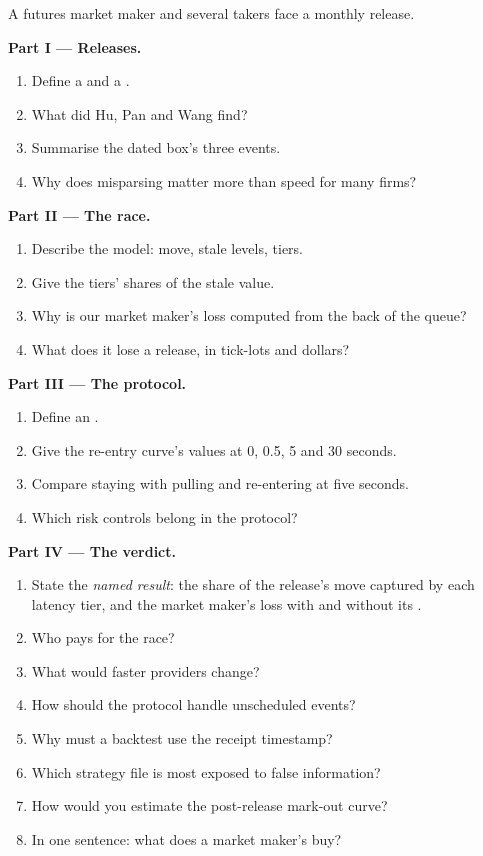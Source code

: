 \begin{problem}\label{pb:hf:news-and-event-trading:1}
A futures market maker and several takers face a monthly release.

\medskip\noindent\textbf{Part I --- Releases.}
\begin{enumerate}
\item Define a  and a .
\item What did Hu, Pan and Wang find?
\item Summarise the dated box's three events.
\item Why does misparsing matter more than speed for many firms?
\end{enumerate}

\medskip\noindent\textbf{Part II --- The race.}
\begin{enumerate}[resume]
\item Describe the model: move, stale levels, tiers.
\item Give the tiers' shares of the stale value.
\item Why is our market maker's loss computed from the back of the queue?
\item What does it lose a release, in tick-lots and dollars?
\end{enumerate}

\medskip\noindent\textbf{Part III --- The protocol.}
\begin{enumerate}[resume]
\item Define an .
\item Give the re-entry curve's values at 0, 0.5, 5 and 30 seconds.
\item Compare staying with pulling and re-entering at five seconds.
\item Which risk controls belong in the protocol?
\end{enumerate}

\medskip\noindent\textbf{Part IV --- The verdict.}
\begin{enumerate}[resume]
\item State the \emph{named result}: the share of the release's move captured by each latency tier, and the market maker's loss with and without
its .
\item Who pays for the race?
\item What would faster providers change?
\item How should the protocol handle unscheduled events?
\item Why must a backtest use the receipt timestamp?
\item Which strategy file is most exposed to false information?
\item How would you estimate the post-release mark-out curve?
\item In one sentence: what does a market maker's  buy?
\end{enumerate}
\end{problem}

